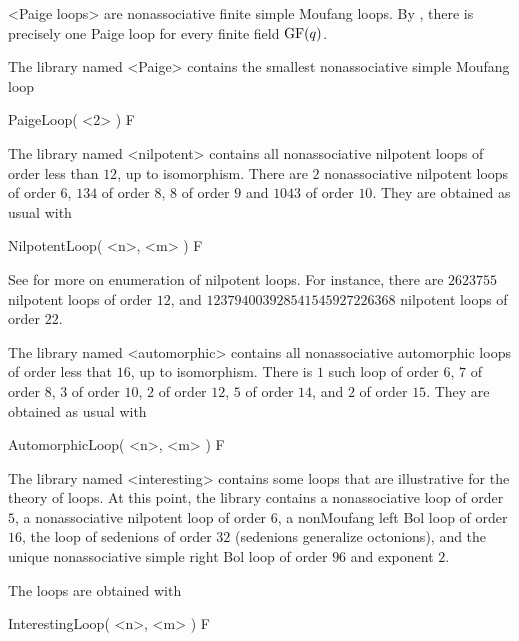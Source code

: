 
<Paige loops> are nonassociative finite
simple Moufang loops. By \cite{Li}, there is precisely one Paige loop for every
finite field ${\rm{GF}}(q)$.

The library named <Paige> contains the smallest nonassociative simple Moufang
loop

\>PaigeLoop( <2> ) F


The library named <nilpotent> contains all nonassociative nilpotent loops of
order less than $12$, up to isomorphism. There are $2$ nonassociative nilpotent
loops of order $6$, $134$ of order $8$, $8$ of order $9$ and $1043$ of order
$10$. They are obtained as usual with

\>NilpotentLoop( <n>, <m> ) F

See \cite{DaVo} for more on enumeration of nilpotent loops. For instance, there
are $2623755$ nilpotent loops of order $12$, and $123794003928541545927226368$
nilpotent loops of order $22$.


The library named <automorphic> contains all nonassociative automorphic loops of order
less that $16$, up to isomorphism. There is $1$ such loop of order $6$, $7$ of
order $8$, $3$ of order $10$, $2$ of order $12$, $5$ of order $14$, and $2$ of order $15$.
They are obtained as usual with

\>AutomorphicLoop( <n>, <m> ) F


The library named <interesting> contains some loops that are illustrative for the theory of loops. At this point, the library contains a nonassociative loop of order $5$, a nonassociative nilpotent loop of order $6$, a nonMoufang left Bol loop of order $16$, the loop of sedenions of order $32$ (sedenions generalize octonions), and the unique nonassociative simple right Bol loop of order $96$ and exponent $2$.

The loops are obtained with

\>InterestingLoop( <n>, <m> ) F

